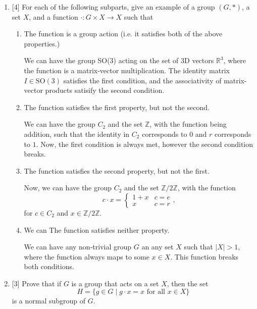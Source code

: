 \documentclass{article}
\newcommand{\R}{\mathbb{R}}
\newcommand{\Z}{\mathbb{Z}}
\begin{document}
\begin{enumerate}
    \item {
        [4] For each of the following subparts, give an example of a group \((G,*)\), a set \(X\), and a function \(\cdot\colon G \times X \to X\) such that
        \begin{enumerate}
            \item {
                The function is a group action (i.e. it satisfies both of the above properties.)

                We can have the group SO(3) acting on the set of 3D vectors \(\R^3\),
                where the function is a matrix-vector multiplication. The 
                identity matrix \(I \in \text{SO}(3)\) satisfies the first 
                condition, and the associativity of matrix-vector products 
                satisify the second condition.
            }
            \item {
                The function satisfies the first property, but not the second.

                We can have the group \(C_2\) and the set \(\Z\), with the function 
                being addition, such that the identity in \(C_2\) corresponds to 
                \(0\) and \(r\) corresponds to \(1\). Now, the first condition
                is always met, however the second condition breaks.
            }
            \item {
                The function satisfies the second property, but not the first.

                Now, we can have the group \(C_2\) and the set \(\Z / 2\Z\), with 
                the function 
                \[
                    c \cdot x = \begin{cases}
                        1 + x   & c = e \\
                        x       & c = r
                    \end{cases},
                \]
                for \(c \in C_2\) and \(x \in \Z/ 2\Z\).
            }
            \item {
                We can The function satisfies neither property.
                
                We can have any non-trivial group \(G\) an any set \(X\) such that 
                \(|X| > 1\), where the function always maps to some \(x \in X\).
                This function breaks both conditions.
            }
        \end{enumerate}
    }
    \item {
        [3] Prove that if \( G \) is a group that acts on a set \( X \), then 
        the set 
        \[H = \{g \in G \mid g \cdot x = x \text{ for all } x \in X\}\] is a 
        normal subgroup of \( G \).

}
\end{enumerate}
\end{document}

